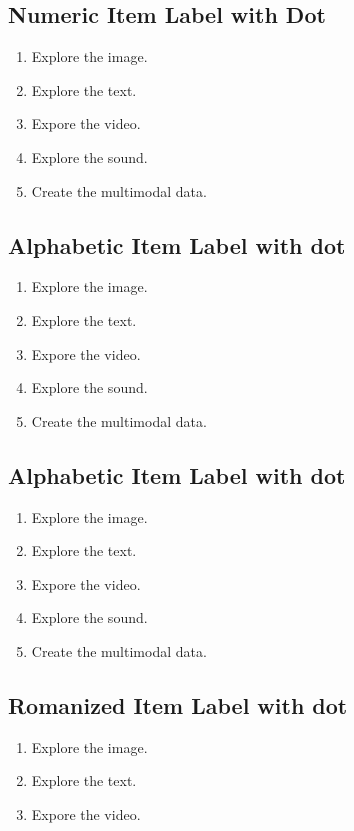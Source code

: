 \documentclass[11pt]{article}
\begin{document}
{\subsection{Numeric Item Label with Dot}
\begin{enumerate}[nosep, label=\arabic*.]
\item Explore the image.
\item Explore the text.
\item Expore the video.
\item Explore the sound.
\item Create the multimodal data.
\end{enumerate}


\subsection{Alphabetic Item Label with dot}
\begin{enumerate}[nosep, label=\alph*.]
\item Explore the image.
\item Explore the text.
\item Expore the video.
\item Explore the sound.
\item Create the multimodal data.
\end{enumerate}


\subsection{Alphabetic Item Label with dot}
\begin{enumerate}[nosep, label=\Alph*.]
\item Explore the image.
\item Explore the text.
\item Expore the video.
\item Explore the sound.
\item Create the multimodal data.
\end{enumerate}

\subsection{Romanized Item Label with dot}
\begin{enumerate}[nosep, label=\roman*.]
\item Explore the image.
\item Explore the text.
\item Expore the video.
\end{enumerate}

}
\end{document}
